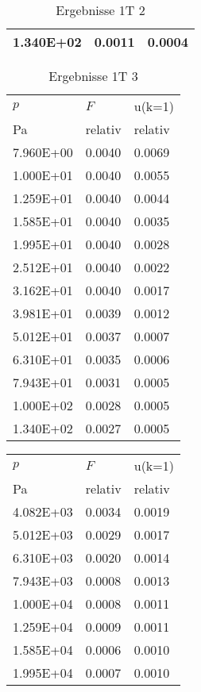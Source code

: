 \begin{table}
\begin{tabular}{l l l }
\num{1.340E+02}&\num{0.0011}&\num{0.0004}\\
\bottomrule
\end{tabular}\caption{Ergebnisse 1T 2}\end{table}\begin{table}\begin{tabular}{l l l }
\toprule
$p$&$F$&u(k=1)\\
 Pa & relativ & relativ\\\midrule
\num{7.960E+00}&\num{0.0040}&\num{0.0069}\\
\num{1.000E+01}&\num{0.0040}&\num{0.0055}\\
\num{1.259E+01}&\num{0.0040}&\num{0.0044}\\
\num{1.585E+01}&\num{0.0040}&\num{0.0035}\\
\num{1.995E+01}&\num{0.0040}&\num{0.0028}\\
\num{2.512E+01}&\num{0.0040}&\num{0.0022}\\
\num{3.162E+01}&\num{0.0040}&\num{0.0017}\\
\num{3.981E+01}&\num{0.0039}&\num{0.0012}\\
\num{5.012E+01}&\num{0.0037}&\num{0.0007}\\
\num{6.310E+01}&\num{0.0035}&\num{0.0006}\\
\num{7.943E+01}&\num{0.0031}&\num{0.0005}\\
\num{1.000E+02}&\num{0.0028}&\num{0.0005}\\
\num{1.340E+02}&\num{0.0027}&\num{0.0005}\\
\bottomrule
\end{tabular}\caption{Ergebnisse 1T 3}\end{table}\begin{table}\begin{tabular}{l l l }
\toprule
$p$&$F$&u(k=1)\\
 Pa & relativ & relativ\\\midrule
\num{4.082E+03}&\num{0.0034}&\num{0.0019}\\
\num{5.012E+03}&\num{0.0029}&\num{0.0017}\\
\num{6.310E+03}&\num{0.0020}&\num{0.0014}\\
\num{7.943E+03}&\num{0.0008}&\num{0.0013}\\
\num{1.000E+04}&\num{0.0008}&\num{0.0011}\\
\num{1.259E+04}&\num{0.0009}&\num{0.0011}\\
\num{1.585E+04}&\num{0.0006}&\num{0.0010}\\
\num{1.995E+04}&\num{0.0007}&\num{0.0010}\\

\end{tabular}
\end{table}
